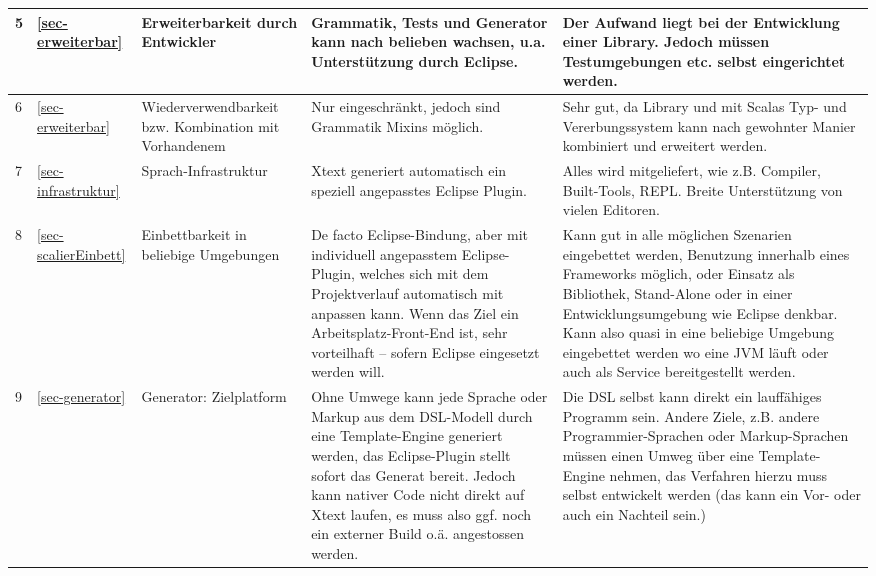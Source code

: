 \begin{landscape}
\begin{longtable}{|p{0.5cm}|p{0.8cm}|p{4.3cm}|p{6.3cm}|p{6.3cm}|}
  5
  & \ref{sec-erweiterbar}
  & Erweiterbarkeit durch Entwickler
  & {\small Grammatik, Tests und Generator kann nach belieben wachsen, u.a.
    Unterstützung durch Eclipse.}
  & {\small Der Aufwand liegt bei der Entwicklung einer Library. Jedoch müssen
    Testumgebungen etc. selbst eingerichtet werden.}
  \\\hline

  6
  & \ref{sec-erweiterbar}
  & Wiederverwendbarkeit bzw. Kombination mit Vorhandenem
  & {\small Nur eingeschränkt, jedoch sind Grammatik Mixins möglich.}
  & {\small Sehr gut, da Library und mit Scalas Typ- und Vererbungssystem kann nach
    gewohnter Manier kombiniert und erweitert werden.}
  \\\hline

  7
  & \ref{sec-infrastruktur}
  & Sprach-Infrastruktur
  & {\small Xtext generiert automatisch ein speziell angepasstes Eclipse Plugin.}
  & {\small Alles wird mitgeliefert, wie z.B. Compiler, Built-Tools, REPL.
    Breite Unterstützung von vielen Editoren.}
  \\\hline

  8
  & \ref{sec-scalierEinbett}
  & Einbettbarkeit in beliebige Umgebungen
  & {\small De facto Eclipse-Bindung, aber mit individuell angepasstem Eclipse-Plugin,
    welches sich mit dem Projektverlauf automatisch mit anpassen kann.
    Wenn das Ziel ein Arbeitsplatz-Front-End ist, sehr vorteilhaft -- sofern
    Eclipse eingesetzt werden will.}
  & {\small Kann gut in alle möglichen Szenarien eingebettet werden, Benutzung
    innerhalb eines Frameworks möglich, oder Einsatz als Bibliothek,
    Stand-Alone oder in einer Entwicklungsumgebung wie Eclipse denkbar.
    Kann also quasi in eine beliebige Umgebung eingebettet werden
    wo eine JVM läuft oder auch als Service bereitgestellt werden.}
  \\\hline

  9
  & \ref{sec-generator}
  & Generator: Zielplatform
  & {\small Ohne Umwege kann jede Sprache oder Markup aus dem DSL-Modell durch eine
    Template-Engine generiert werden, das Eclipse-Plugin stellt sofort das
    Generat bereit. Jedoch kann nativer Code nicht direkt auf Xtext laufen,
    es muss also ggf. noch ein externer Build o.ä. angestossen werden.}
  & {\small Die DSL selbst kann direkt ein lauffähiges Programm sein. Andere Ziele,
    z.B. andere Programmier-Sprachen oder Markup-Sprachen müssen einen Umweg
    über eine Template-Engine nehmen, das
    Verfahren hierzu muss selbst entwickelt werden (das kann ein Vor- oder
    auch ein Nachteil sein.)}
  \\\hline


\end{longtable}
\end{landscape}
